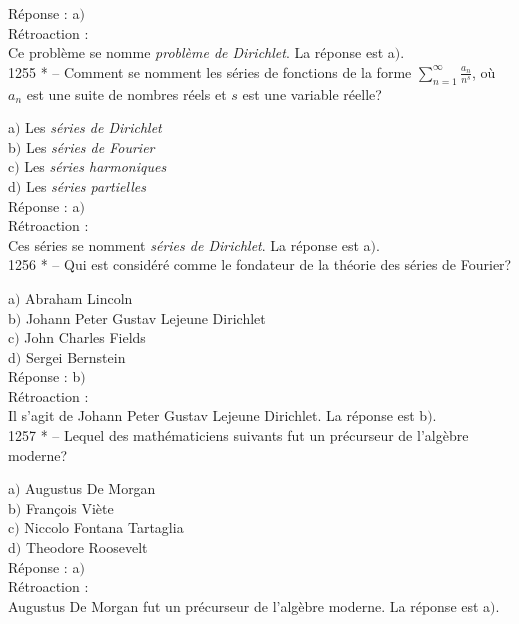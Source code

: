 ﻿\documentclass[letterpaper, 12pt]{article}
\begin{document}
R\'eponse : a$)$\\

R\'etroaction : \\
Ce probl\`eme se nomme {\sl probl\`eme de Dirichlet}.
La r\'eponse est a$)$.\\

1255 * -- Comment se nomment les s\'eries de fonctions de la forme
$\sum_{n=1}^{\infty}\frac{a_n}{n^s}$, o\`u $a_n$ est une suite de
nombres r\'eels et $s$ est une variable r\'eelle?

a$)$ Les {\sl s\'eries de Dirichlet} \\
b$)$ Les {\sl s\'eries de Fourier} \\
c$)$ Les {\sl s\'eries harmoniques} \\
d$)$ Les {\sl s\'eries partielles}\\

R\'eponse : a$)$\\

R\'etroaction : \\
Ces s\'eries se nomment {\sl s\'eries de Dirichlet}.
La r\'eponse est a$)$.\\

1256 * -- Qui est consid\'er\'e comme le fondateur de la {th\'eorie
des s\'eries de Fourier}?

a$)$ Abraham Lincoln \\
b$)$ Johann Peter Gustav Lejeune Dirichlet \\
c$)$ John Charles Fields \\
d$)$ Sergei Bernstein\\

R\'eponse : b$)$\\

R\'etroaction : \\
Il s'agit de Johann Peter Gustav Lejeune Dirichlet.
La r\'eponse est b$)$.\\

1257 * -- Lequel des math\'ematiciens suivants fut un pr\'ecurseur
de l'alg\`ebre moderne?

a$)$ Augustus De Morgan \\
b$)$ Fran\c cois Vi\`ete \\
c$)$ Niccolo Fontana Tartaglia\\
d$)$ Theodore Roosevelt\\

R\'eponse : a$)$\\

R\'etroaction : \\
Augustus De Morgan fut un pr\'ecurseur de l'alg\`ebre moderne.
La r\'eponse est a$)$.\\
\end{document}
